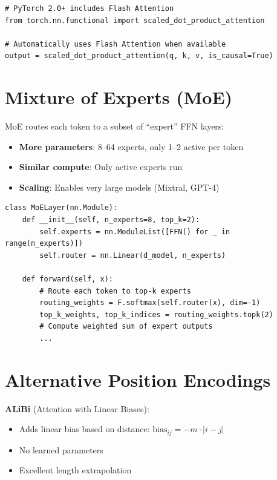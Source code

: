 \begin{lstlisting}[style=python]
# PyTorch 2.0+ includes Flash Attention
from torch.nn.functional import scaled_dot_product_attention

# Automatically uses Flash Attention when available
output = scaled_dot_product_attention(q, k, v, is_causal=True)
\end{lstlisting}

\section{Mixture of Experts (MoE)}

MoE routes each token to a subset of ``expert'' FFN layers:

\begin{itemize}
    \item \textbf{More parameters}: 8--64 experts, only 1--2 active per token
    \item \textbf{Similar compute}: Only active experts run
    \item \textbf{Scaling}: Enables very large models (Mixtral, GPT-4)
\end{itemize}

\begin{lstlisting}[style=python]
class MoELayer(nn.Module):
    def __init__(self, n_experts=8, top_k=2):
        self.experts = nn.ModuleList([FFN() for _ in range(n_experts)])
        self.router = nn.Linear(d_model, n_experts)

    def forward(self, x):
        # Route each token to top-k experts
        routing_weights = F.softmax(self.router(x), dim=-1)
        top_k_weights, top_k_indices = routing_weights.topk(2)
        # Compute weighted sum of expert outputs
        ...
\end{lstlisting}

\section{Alternative Position Encodings}

\textbf{ALiBi} (Attention with Linear Biases):
\begin{itemize}
    \item Adds linear bias based on distance: $\text{bias}_{ij} = -m \cdot |i - j|$
    \item No learned parameters
    \item Excellent length extrapolation
\end{itemize}

